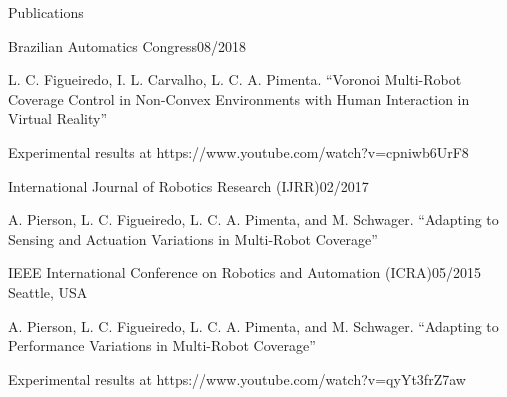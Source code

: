 \documentclass[14pt, a4paper]{resume} %
\begin{document}
\begin{rSection}{Publications}
	
\begin{rSubsection}{Brazilian Automatics Congress}{08/2018}{}{}
	
\item L. C. Figueiredo, I. L. Carvalho, L. C. A. Pimenta. ``Voronoi Multi-Robot Coverage Control in Non-Convex Environments with Human Interaction in Virtual Reality''
\item Experimental results at https://www.youtube.com/watch?v=cpniwb6UrF8

\end{rSubsection}	
	
\begin{rSubsection}{International Journal of Robotics Research (IJRR)}{02/2017}{}{}
	
\item A. Pierson, L. C. Figueiredo, L. C. A. Pimenta, and M. Schwager. ``Adapting to Sensing and Actuation Variations in Multi-Robot Coverage''

\end{rSubsection}

\begin{rSubsection}{IEEE International Conference on Robotics and Automation (ICRA)}{05/2015}{}{ \normalfont Seattle, USA}

\item A. Pierson, L. C. Figueiredo, L. C. A. Pimenta, and M. Schwager. ``Adapting to Performance Variations in Multi-Robot Coverage''
\item Experimental results at https://www.youtube.com/watch?v=qyYt3frZ7aw


\end{rSubsection}


\end{rSection}



\end{document}
